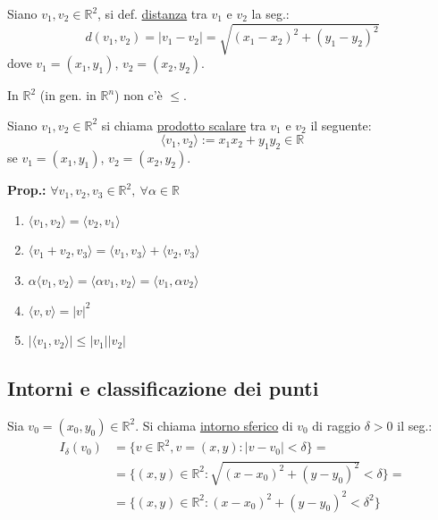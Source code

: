 
\begin{definition}
Siano $v_1, v_2 \in \mathbb{R}^2$, si def. \underline{distanza} tra $v_1$ e $v_2$ la seg.:
\[
d(v_1, v_2) = \vert v_1 - v_2 \vert = \sqrt{(x_1 - x_2)^2 + (y_1 - y_2)^2}
\]
dove $v_1 = (x_1, y_1)$, $v_2 = (x_2, y_2)$.
\end{definition}

\begin{oss}
In $\mathbb{R}^2$ (in gen. in $\mathbb{R}^n$) non c'è $\le$.
\end{oss}

\begin{definition}
Siano $v_1, v_2 \in \mathbb{R}^2$ si chiama \underline{prodotto scalare} tra $v_1$ e $v_2$ il seguente:
\[
\langle v_1, v_2 \rangle := x_1 x_2 + y_1 y_2 \in \mathbb{R}
\]
se $v_1 = (x_1, y_1)$, $v_2 = (x_2, y_2)$.
\end{definition}

\textbf{Prop.:} $\forall v_1, v_2, v_3 \in \mathbb{R}^2, \ \forall \alpha \in \mathbb{R}$
\begin{enumerate}
    \item $\langle v_1, v_2 \rangle = \langle v_2, v_1 \rangle$
    \item $\langle v_1 + v_2, v_3 \rangle = \langle v_1, v_3 \rangle + \langle v_2, v_3 \rangle$
    \item $\alpha \langle v_1, v_2 \rangle = \langle \alpha v_1, v_2 \rangle = \langle v_1, \alpha v_2 \rangle$
    \item $\langle v, v \rangle = \vert v \vert^2$
    \item $\vert \langle v_1, v_2 \rangle \vert \le \vert v_1 \vert \vert v_2 \vert$
\end{enumerate}

\subsection{Intorni e classificazione dei punti}

\begin{definition}
Sia $v_0 = (x_0, y_0) \in \mathbb{R}^2$. Si chiama \underline{intorno sferico} di $v_0$ di raggio $\delta > 0$ il seg.:
\[
\begin{aligned}
I_\delta(v_0) &= \{ v \in \mathbb{R}^2, v = (x, y) : \vert v - v_0 \vert < \delta \} = \\
&= \{ (x, y) \in \mathbb{R}^2 : \sqrt{(x - x_0)^2 + (y - y_0)^2} < \delta \} = \\
&= \{ (x, y) \in \mathbb{R}^2 : (x - x_0)^2 + (y - y_0)^2 < \delta^2 \}
\end{aligned}
\]
\end{definition}

